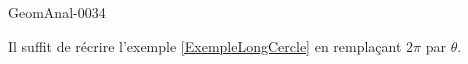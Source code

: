 \begin{corrige}{GeomAnal-0034}

    Il suffit de récrire l'exemple \ref{ExempleLongCercle} en remplaçant \( 2\pi\) par \( \theta\).

\end{corrige}
